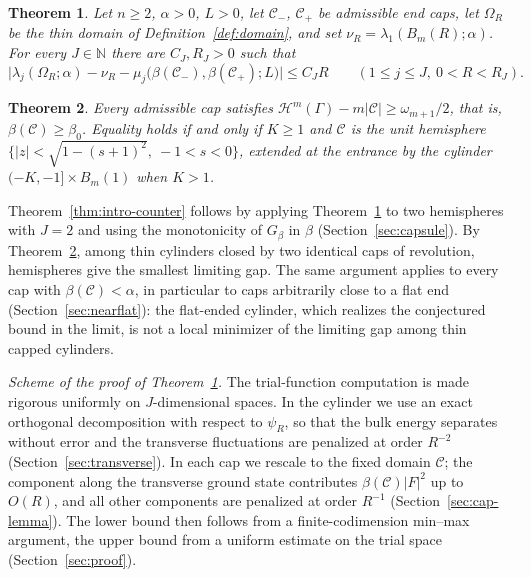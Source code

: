 \documentclass[11pt,a4paper]{article}
\numberwithin{equation}{section}
\theoremstyle{paperplain}
\newtheorem{theorem}{Theorem}[section]
\theoremstyle{remark}
\newcommand{\C}{\mathcal{C}}
\newcommand{\HH}{\mathcal{H}}
\begin{document}
\begin{theorem}\label{thm:intro-main}
Let $n\ge2$, $\alpha>0$, $L>0$, let $\C_-$, $\C_+$ be admissible end caps,
let $\Omega_R$ be the thin domain of Definition~\ref{def:domain}, and set
$\nu_R=\lambda_1(B_m(R);\alpha)$. For every $J\in\mathbb N$ there are
$C_J,R_J>0$ such that
\begin{equation}\label{eq:main}
 \bigl|\lambda_j(\Omega_R;\alpha)-\nu_R-\mu_j\bigl(\beta(\C_-),\beta(\C_+);L\bigr)\bigr|
 \le C_JR\qquad(1\le j\le J,\ 0<R<R_J).
\end{equation}
\end{theorem}

\begin{theorem}\label{thm:intro-cap}
Every admissible cap satisfies $\HH^m(\Gamma)-m|\C|\ge\omega_{m+1}/2$, that
is, $\beta(\C)\ge\beta_0$. Equality holds if and only if $K\ge1$ and $\C$ is
the unit hemisphere $\{|z|<\sqrt{1-(s+1)^2},\ -1<s<0\}$, extended at the
entrance by the cylinder $(-K,-1]\times B_m(1)$ when $K>1$.
\end{theorem}

Theorem~\ref{thm:intro-counter} follows by applying
Theorem~\ref{thm:intro-main} to two hemispheres with $J=2$ and using the
monotonicity of $G_\beta$ in $\beta$ (Section~\ref{sec:capsule}). By
Theorem~\ref{thm:intro-cap}, among thin cylinders closed by two identical
caps of revolution, hemispheres give the smallest limiting gap. The same
argument applies to every cap with $\beta(\C)<\alpha$, in particular to
caps arbitrarily close to a flat end (Section~\ref{sec:nearflat}): the
flat-ended cylinder, which realizes the conjectured bound in the limit, is
not a local minimizer of the limiting gap among thin capped cylinders.

\emph{Scheme of the proof of Theorem~\ref{thm:intro-main}.} The
trial-function computation is made rigorous uniformly on $J$-dimensional
spaces. In the cylinder we use an exact orthogonal decomposition with
respect to $\psi_R$, so that the bulk energy separates without error and
the transverse fluctuations are penalized at order $R^{-2}$
(Section~\ref{sec:transverse}). In each cap we rescale to the fixed domain
$\C$; the component along the transverse ground state contributes
$\beta(\C)|F|^2$ up to $O(R)$, and all other components are penalized at
order $R^{-1}$ (Section~\ref{sec:cap-lemma}). The lower bound then follows
from a finite-codimension min--max argument, the upper bound from a uniform
estimate on the trial space (Section~\ref{sec:proof}).
\end{document}
